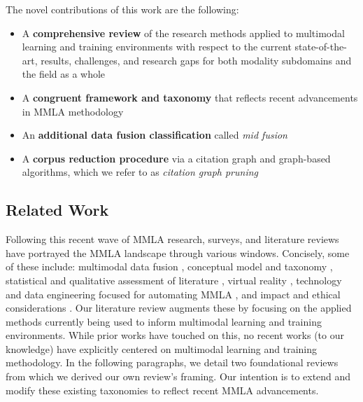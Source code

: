 \documentclass[manuscript,screen,review]{acmart}
\begin{document}
The novel contributions of this work are the following: 
\begin{itemize}
    \item A \textbf{comprehensive review} of the research methods applied to multimodal learning and training environments with respect to the current state-of-the-art, results, challenges, and research gaps for both modality subdomains and the field as a whole
    \item A \textbf{congruent framework and taxonomy} that reflects recent advancements in MMLA methodology
    \item An \textbf{additional data fusion classification} called \textit{mid fusion}
    \item A \textbf{corpus reduction procedure} via a citation graph and graph-based algorithms, which we refer to as \textit{citation graph pruning}
\end{itemize}

\subsection{Related Work} \label{subsec:related_work}

Following this recent wave of MMLA research, surveys, and literature reviews have portrayed the MMLA landscape through various windows. Concisely, some of these include: multimodal data fusion \cite{chango_review_2022}, conceptual model and taxonomy \cite{di_mitri_signals_2018}, statistical and qualitative assessment of literature \cite{sharma_multimodal_2020, qushem_trends_2020}, virtual reality \cite{philippe_multimodal_2020}, technology and data engineering focused for automating MMLA \cite{chua_technologies_2019}, and impact and ethical considerations \cite{alwahaby_evidence_2021}. Our literature review augments these by focusing on the applied methods currently being used to inform multimodal learning and training environments. While prior works have touched on this, no recent works (to our knowledge) have explicitly centered on multimodal learning and training methodology. In the following paragraphs, we detail two foundational reviews from which we derived our own review's framing. Our intention is to extend and modify these existing taxonomies to reflect recent MMLA advancements. 
\end{document}
